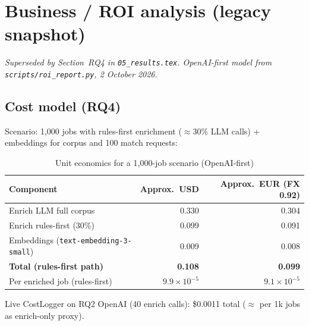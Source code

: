 
\chapter{Business / ROI analysis (legacy snapshot)}
\label{ch:roi-legacy}

\noindent\textit{Superseded by Section~RQ4 in \texttt{05\_results.tex}. OpenAI-first model from \texttt{scripts/roi\_report.py}, 2 October 2026.}

\section{Cost model (RQ4)}

Scenario: 1{,}000 jobs with rules-first enrichment ($\approx$30\% LLM calls) + embeddings for corpus and 100 match requests:

\begin{table}[ht]
\centering
\caption{Unit economics for a 1{,}000-job scenario (OpenAI-first)}
\label{tab:roi-legacy}
\begin{tabular}{@{}lrr@{}}
\toprule
\textbf{Component} & \textbf{Approx.\ USD} & \textbf{Approx.\ EUR (FX 0.92)} \\
\midrule
Enrich LLM full corpus & 0.330 & 0.304 \\
Enrich rules-first (30\%) & 0.099 & 0.091 \\
Embeddings (\texttt{text-embedding-3-small}) & 0.009 & 0.008 \\
\textbf{Total (rules-first path)} & \textbf{0.108} & \textbf{0.099} \\
Per enriched job (rules-first) & $9.9\times10^{-5}$ & $9.1\times10^{-5}$ \\
\bottomrule
\end{tabular}
\end{table}

Live CostLogger on RQ2 OpenAI (40 enrich calls): \$0.0011 total ($\approx$ per 1k jobs as enrich-only proxy).
